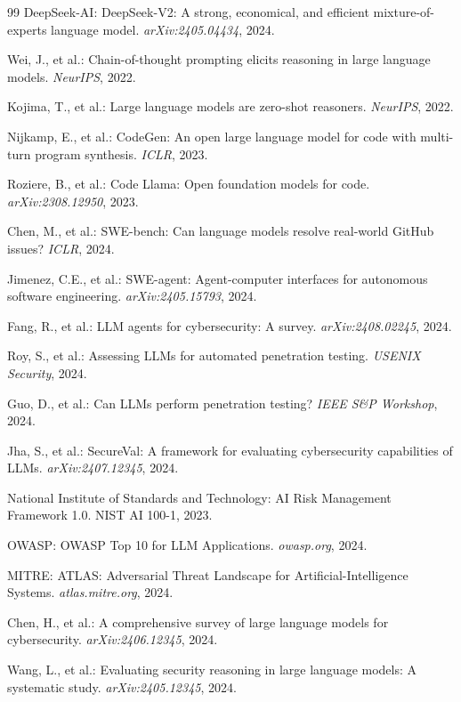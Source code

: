 \documentclass[journal]{IEEEtran}
\begin{document}
\begin{thebibliography}{99}
DeepSeek-AI: DeepSeek-V2: A strong, economical, and efficient mixture-of-experts language model. \emph{arXiv:2405.04434}, 2024.

Wei, J., et al.: Chain-of-thought prompting elicits reasoning in large language models. \emph{NeurIPS}, 2022.

Kojima, T., et al.: Large language models are zero-shot reasoners. \emph{NeurIPS}, 2022.

Nijkamp, E., et al.: CodeGen: An open large language model for code with multi-turn program synthesis. \emph{ICLR}, 2023.

Roziere, B., et al.: Code Llama: Open foundation models for code. \emph{arXiv:2308.12950}, 2023.

Chen, M., et al.: SWE-bench: Can language models resolve real-world GitHub issues? \emph{ICLR}, 2024.

Jimenez, C.E., et al.: SWE-agent: Agent-computer interfaces for autonomous software engineering. \emph{arXiv:2405.15793}, 2024.

Fang, R., et al.: LLM agents for cybersecurity: A survey. \emph{arXiv:2408.02245}, 2024.

Roy, S., et al.: Assessing LLMs for automated penetration testing. \emph{USENIX Security}, 2024.

Guo, D., et al.: Can LLMs perform penetration testing? \emph{IEEE S\&P Workshop}, 2024.

Jha, S., et al.: SecureVal: A framework for evaluating cybersecurity capabilities of LLMs. \emph{arXiv:2407.12345}, 2024.

National Institute of Standards and Technology: AI Risk Management Framework 1.0. NIST AI 100-1, 2023.

OWASP: OWASP Top 10 for LLM Applications. \emph{owasp.org}, 2024.

MITRE: ATLAS: Adversarial Threat Landscape for Artificial-Intelligence Systems. \emph{atlas.mitre.org}, 2024.

Chen, H., et al.: A comprehensive survey of large language models for cybersecurity. \emph{arXiv:2406.12345}, 2024.

Wang, L., et al.: Evaluating security reasoning in large language models: A systematic study. \emph{arXiv:2405.12345}, 2024.


\end{thebibliography}
\end{document}
